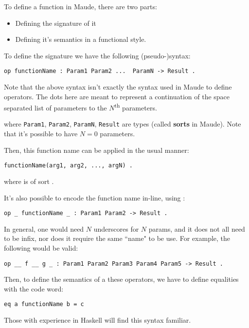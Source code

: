 To define a function in Maude, there are two parts:
\begin{itemize}
    \item Defining the signature of it
    \item Defining it's semantics in a functional style.
\end{itemize}

To define the signature we have the following (pseudo-)syntax:

\begin{verbatim}
op functionName : Param1 Param2 ...  ParamN -> Result .
\end{verbatim}

Note that the above syntax isn't exactly the syntax used in Maude to define operators. The dots here are meant to represent a continuation of the space separated list of parameters to the $N$\textsuperscript{th} parameters.

where \verb`Param1`, \verb`Param2`, \verb`ParamN`, \verb`Result` are types (called \textbf{sorts} in Maude). Note that it's possible to have $N = 0$ parameters.

Then, this function name can be applied in the usual manner:
\begin{verbatim}
functionName(arg1, arg2, ..., argN) .
\end{verbatim}

where  is of sort .

It's also possible to encode the function name in-line, using \code{\_}:

\begin{verbatim}
op _ functionName _ : Param1 Param2 -> Result .
\end{verbatim}

In general, one would need $N$ underscores for $N$ params, and it does not all need to be infix, nor does it require the same ``name" to be use. For example, the following would be valid:

\begin{verbatim}
op __ f __ g _ : Param1 Param2 Param3 Param4 Param5 -> Result .
\end{verbatim}

Then, to define the semantics of a these operators, we have to define equalities with the  code word:

\begin{verbatim}
eq a functionName b = c
\end{verbatim}

Those with experience in Haskell will find this syntax familiar.

